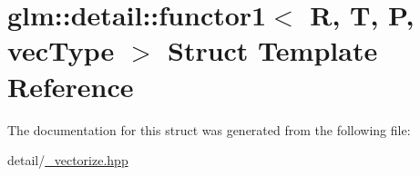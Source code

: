 \hypertarget{structglm_1_1detail_1_1functor1}{\section{glm\-:\-:detail\-:\-:functor1$<$ R, T, P, vec\-Type $>$ Struct Template Reference}
\label{structglm_1_1detail_1_1functor1}
}


The documentation for this struct was generated from the following file\-:\begin{DoxyCompactItemize}
\item 
detail/\hyperlink{__vectorize_8hpp}{\-\_\-vectorize.\-hpp}\end{DoxyCompactItemize}
